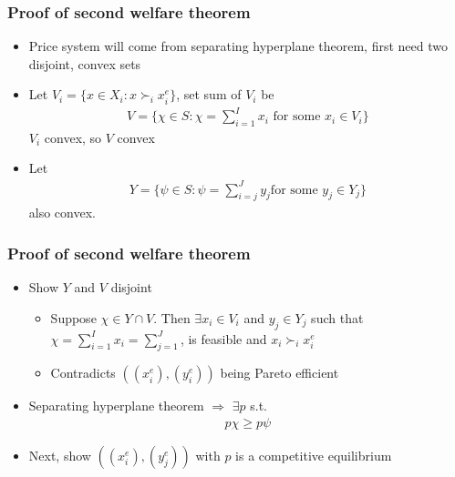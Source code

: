 \documentclass[compress]{beamer}
\newcommand{\pref}{\succ}
\begin{document}
\begin{frame}
  \frametitle{Proof of second welfare theorem}
  \begin{itemize}
  \item Price system will come from separating hyperplane theorem,
    first need two disjoint, convex sets
  \item Let $V_i = \{ x \in X_i : x \pref_i
    x_i^e \}$, set sum of $V_i$ be
    \begin{align*}
      V = \{ \chi \in S: \chi = \sum_{i=1}^I x_i \text{ for some } x_i
      \in V_i \}  
    \end{align*}
    $V_i$ convex, so $V$ convex
  \item Let 
    \begin{align*}
      Y = \{ \psi \in S: \psi = \sum_{i=j}^J y_j \text{
        for some } y_j \in Y_j \}  
    \end{align*}
    also convex.
  \end{itemize}
\end{frame}

\begin{frame}
  \frametitle{Proof of second welfare theorem}
  \begin{itemize}
  \item Show $Y$ and $V$ disjoint
    \begin{itemize}
    \item Suppose $\chi \in Y \cap V$. Then $\exists x_i \in V_i$ and
      $y_j \in Y_j$ such that $\chi = \sum_{i=1}^I x_i =
      \sum_{j=1}^J$, is feasible and $x_i \pref_i x_i^e$
    \item Contradicts $((x_i^e),(y_i^e))$ being Pareto efficient
    \end{itemize}
  \item Separating hyperplane theorem $\Rightarrow$ $\exists p$ s.t.
    \begin{align}
      p \chi \geq p \psi \label{ieq:p}
    \end{align}
  \item Next, show $((x_i^e), (y_j^e))$ with $p$ is a competitive
    equilibrium 
  \end{itemize}
\end{frame}
\end{document}
